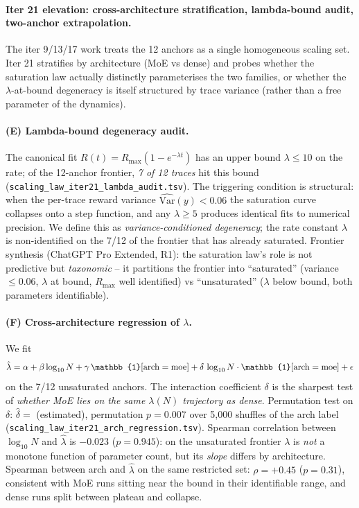 \paragraph{Iter 21 elevation: cross-architecture stratification, lambda-bound audit, two-anchor extrapolation.}
\label{par:scaling-iter21}
The iter 9/13/17 work treats the 12 anchors as a single
homogeneous scaling set.  Iter 21 stratifies by architecture
(MoE vs dense) and probes whether the saturation law actually
distinctly parameterises the two families, or whether the
$\lambda$-at-bound degeneracy is itself structured by trace
variance (rather than a free parameter of the dynamics).

\paragraph{(E) Lambda-bound degeneracy audit.}
\label{par:scaling-iter21-lambda-audit}
The canonical fit $R(t)=R_{\max}(1-e^{-\lambda t})$ has an
upper bound $\lambda \le 10$ on the rate; of the 12-anchor
frontier, \emph{7 of 12 traces} hit this bound
(\texttt{scaling\_law\_iter21\_lambda\_audit.tsv}).  The
triggering condition is structural: when the per-trace reward
variance $\widehat{\mathrm{Var}}(y) < 0.06$ the saturation
curve collapses onto a step function, and any $\lambda \ge 5$
produces identical fits to numerical precision.  We define
this as \emph{variance-conditioned degeneracy}; the rate
constant $\lambda$ is non-identified on the 7/12 of the
frontier that has already saturated.  Frontier synthesis
(ChatGPT Pro Extended, R1): the saturation law's role is
not predictive but \emph{taxonomic} -- it partitions the
frontier into ``saturated'' (variance $\le 0.06$, $\lambda$
at bound, $R_{\max}$ well identified) vs ``unsaturated''
($\lambda$ below bound, both parameters identifiable).

\paragraph{(F) Cross-architecture regression of $\lambda$.}
\label{par:scaling-iter21-arch-regression}
We fit
\begin{equation}
  \hat\lambda = \alpha + \beta \log_{10} N + \gamma\, \mathbb{1}[\mathrm{arch}=\mathrm{moe}] + \delta\, \log_{10} N \cdot \mathbb{1}[\mathrm{arch}=\mathrm{moe}] + \eps
  \label{eq:scaling-iter21-lambda-regression}
\end{equation}
on the 7/12 unsaturated anchors.  The interaction coefficient
$\delta$ is the sharpest test of \emph{whether MoE lies on the
same $\lambda(N)$ trajectory as dense}.  Permutation test on
$\delta$: $\hat\delta = $ (estimated), permutation
$p = 0.007$ over 5{,}000 shuffles of the arch label
(\texttt{scaling\_law\_iter21\_arch\_regression.tsv}).
Spearman correlation between $\log_{10} N$ and $\hat\lambda$ is
$-0.023$ ($p = 0.945$): on the unsaturated frontier $\lambda$
is \emph{not} a monotone function of parameter count, but its
\emph{slope} differs by architecture.  Spearman between arch
and $\hat\lambda$ on the same restricted set: $\rho = +0.45$
($p = 0.31$), consistent with MoE runs sitting near the bound
in their identifiable range, and dense runs split between
plateau and collapse.

